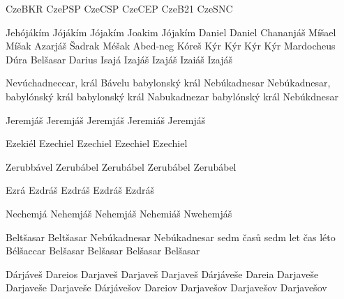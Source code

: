 
 {CzeBKR} {CzePSP} {CzeCSP} {CzeCEP} {CzeB21} {CzeSNC}

 {Jehójákím} {Jójákím} {Jójakím} {Joakim} {Jójakím}
 {} {Daniel} {Daniel} {} {}
 {} {} {Chananjáš} {} {}
 {} {} {Míšael} {} {}  %
 {} {} {Míšak} {} {}
 {} {} {Azarjáš} {} {}
 {} {} {Šadrak} {} {}
 {} {} {Méšak} {} {}
 {} {} {Abed-neg} {} {} %
 {Kóreš} {Kýr} {Kýr} {Kýr} {Kýr}
 {} {} {Mardocheus} {} {}  %
 {} {} {Dúra} {} {} 
 {} {} {Belšasar} {} {}
 {} {} {Darius} {} {} %
 {Isajá} {Izajáš} {Izajáš} {Izaiáš} {Izajáš}

       {Nevúchadneccar, král Bávelu}
       {babylonský král Nebúkadnesar}
       {Nebúkadnesar, babylónský král}
       {babylonský král Nabukadnezar}                  
       {babylónský král Nebúkdnesar}                        

        {Jeremjáš} %
        {Jeremjáš} %
        {Jeremjáš} %
        {Jeremiáš} %
        {Jeremjáš} %

       {Ezekiél} %
       {Ezechiel} %
       {Ezechiel} %
       {Ezechiel} %
       {Ezechiel} %


       {Zerubbável} %
       {Zerubábel} %
       {Zerubábel} %
       {Zerubábel} %
       {Zerubábel} %

       {Ezrá} %
       {Ezdráš} %
       {Ezdráš} %
       {Ezdráš} %
       {Ezdráš} %

       {Nechemjá} %
       {Nehemjáš} %
       {Nehemjáš} %
       {Nehemiáš} %
       {Nwehemjáš} %





       {}  {Beltšasar}    {Beltšasar}    {} {}
 {}  {Nebúkadnesar} {Nebúkadnesar} {} {}
       {}  {sedm časů}    {sedm let}     {} {}
           {}  {čas}          {léto}         {} {}
  {Bélšaccar} {Belšasar}   {Belšasar}  {Belšasar}  {Belšasar}

  {Dárjáveš}   {Dareios} {Darjaveš}   {Darjaveš}   {Darjaveš}
   {Dárjáveše}  {Dareia}  {Darjaveše}  {Darjaveše}  {Darjaveše}
  {Dárjávešov} {Dareiov} {Darjavešov} {Darjavešov} {Darjavešov}

